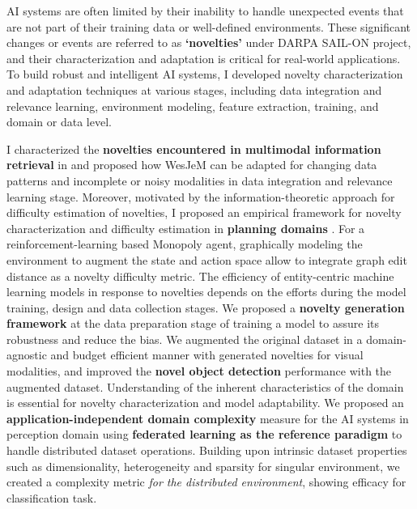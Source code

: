 
AI systems are often limited by their inability to handle unexpected events that are not part of their training data or well-defined environments. These significant changes or events are referred to as \textbf{`novelties'} under DARPA SAIL-ON project, and their characterization and adaptation is critical for real-world applications. To build robust and intelligent AI systems, I developed novelty characterization and adaptation techniques at various stages, including data integration and relevance learning, environment modeling, feature extraction, training, and domain or data level.

I characterized the \textbf{novelties encountered in multimodal information retrieval} in \cite{solaiman2022open} and proposed how WesJeM can be adapted for changing data patterns and incomplete or noisy modalities in data integration and relevance learning stage.
Moreover, motivated by the information-theoretic approach for difficulty estimation of novelties, I proposed an empirical framework for novelty characterization and difficulty estimation in \textbf{planning domains} \cite{solaiman2022measurement}. For a reinforcement-learning based Monopoly agent, graphically modeling the environment to augment the state and action space allow to integrate graph edit distance as a novelty difficulty metric.
%
The efficiency of entity-centric machine learning models in response to novelties depends on the efforts during the model training, design and data collection stages. We proposed a \textbf{novelty generation framework} \cite{nesen2021dataset} at
the data preparation stage of training a model to assure its robustness and reduce the bias. We augmented the original dataset in a domain-agnostic
and budget efficient manner with generated novelties for visual modalities, %
and improved the \textbf{novel object detection} performance with the augmented dataset.
%
%
Understanding of the inherent characteristics of the domain is essential for novelty characterization and model adaptability. %
We proposed an \textbf{application-independent domain complexity} measure for the AI systems in perception domain \cite{solaiman2023domainComplexity} using \textbf{federated learning as the reference paradigm} to handle distributed dataset operations.
Building upon intrinsic dataset properties such as dimensionality, heterogeneity and sparsity for singular environment, we created a complexity metric \textit{for the distributed environment}, showing efficacy for classification task. 
